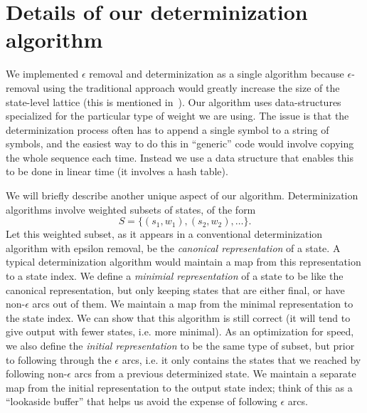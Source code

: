 \documentclass{article}
\begin{document}
\section{Details of our determinization algorithm}
\label{sec:details}

We implemented $\epsilon$ removal and determinization as a single algorithm 
because $\epsilon$-removal using the traditional approach would greatly
increase the size of the state-level lattice (this is mentioned 
in~\cite{efficient_general}).  Our algorithm uses data-structures
specialized for the particular type of weight we are using.  The issue
is that the determinization process often has to append a single symbol to
a string of symbols, and the easiest way to
do this in ``generic'' code would involve copying the whole sequence each time.
Instead we use a data structure that enables this to be done in linear
time (it involves a hash table).  

We will briefly describe another unique aspect of our
algorithm.  Determinization algorithms involve weighted subsets of states,
of the form
\begin{equation}
   S = \{ (s_1, w_1), (s_2, w_2), \ldots \} .
\end{equation}
Let this weighted subset, as it appears in a conventional determinization
algorithm with epsilon removal, be the {\em canonical representation} of a state.
A typical determinization algorithm would maintain a map from this representation
to a state index.  We define a {\em minimial representation} of a state
to be like the canonical representation, but only keeping states that
are either final, or have non-$\epsilon$ arcs out of them.  We maintain
a map from the minimal representation to the state index.  We can
show that this algorithm is still correct (it will tend to give output
with fewer states, i.e. more minimal).  As an optimization for speed, we also define
the {\em initial representation} to be the same type of subset, but prior
to following through the $\epsilon$ arcs, i.e. it only contains the states
that we reached by following non-$\epsilon$ arcs from a previous determinized
state.  We maintain a separate map from the initial representation to
the output state index; think of this as a ``lookaside buffer'' that helps us
avoid the expense of following $\epsilon$ arcs. 
\end{document}
